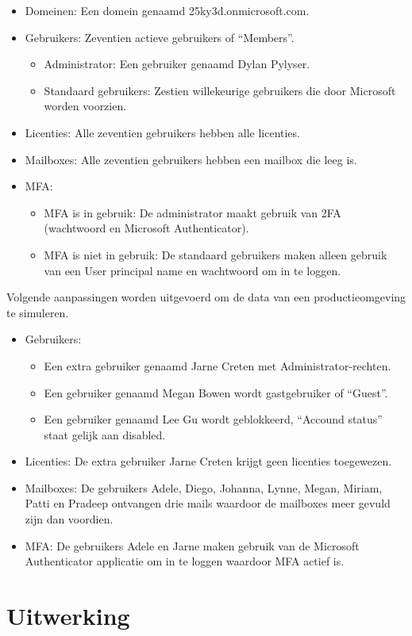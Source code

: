 \begin{itemize}
    \item Domeinen: Een domein genaamd 25ky3d.onmicrosoft.com.
    \item Gebruikers: Zeventien actieve gebruikers of “Members”.
    \begin{itemize}
        \item Administrator: Een gebruiker genaamd Dylan Pylyser.
        \item Standaard gebruikers: Zestien willekeurige gebruikers die door Microsoft worden voorzien.
    \end{itemize}
    \item Licenties: Alle zeventien gebruikers hebben alle licenties.
    \item Mailboxes: Alle zeventien gebruikers hebben een mailbox die leeg is.
    \item \Ac{MFA}: 
        \begin{itemize}
            \item \ac{MFA} is in gebruik: De administrator maakt gebruik van \ac{2FA} (wachtwoord en Microsoft Authenticator).
            \item \Ac{MFA} is niet in gebruik: De standaard gebruikers maken alleen gebruik van een User principal name en wachtwoord om in te loggen.
        \end{itemize}
\end{itemize}

Volgende aanpassingen worden uitgevoerd om de data van een productieomgeving te simuleren.

\begin{itemize}
    \item Gebruikers: 
    \begin{itemize}
        \item Een extra gebruiker genaamd Jarne Creten met Administrator-rechten.
        \item Een gebruiker genaamd Megan Bowen wordt gastgebruiker of “Guest”.
        \item Een gebruiker genaamd Lee Gu wordt geblokkeerd, “Accound status” staat gelijk aan disabled.
    \end{itemize}
    \item Licenties: De extra gebruiker Jarne Creten krijgt geen licenties toegewezen.
    \item Mailboxes: De gebruikers Adele, Diego, Johanna, Lynne, Megan, Miriam, Patti en Pradeep ontvangen drie mails waardoor de mailboxes meer gevuld zijn dan voordien.
    \item \ac{MFA}: De gebruikers Adele en Jarne maken gebruik van de Microsoft Authenticator applicatie om in te loggen waardoor \ac{MFA} actief is.
\end{itemize}

\section{Uitwerking}


